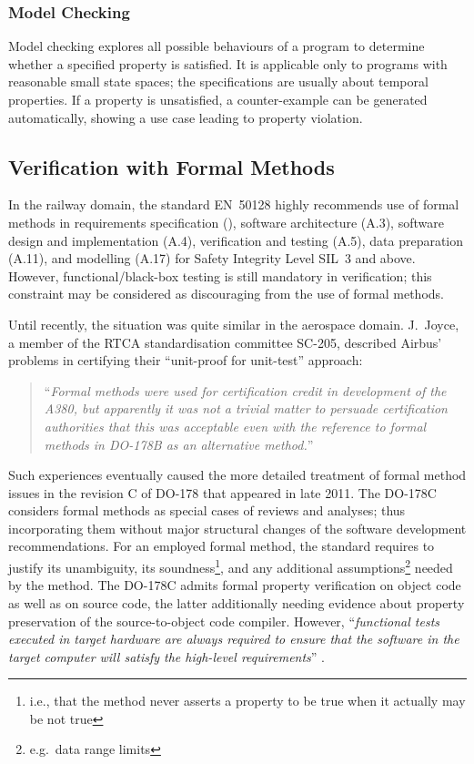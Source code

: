 \documentclass{template/openetcs_report}
\begin{document}
\subsubsection{Model Checking}
\label{sec:Model Checking}

Model checking
\cite{Clarke.Schlingloff.2001}\nocite{Robinson.Voronkov.2001}
explores all possible behaviours of a program to
determine whether a specified property is satisfied.
%
It is applicable only to programs with reasonable small state spaces;
the specifications are usually about temporal properties.
%
If a property is unsatisfied, a counter-example can be generated
automatically,
showing a use case leading to property violation.


\subsection{Verification with Formal Methods}

In the railway domain, the standard
EN~50128 highly recommends use of formal methods in
requirements specification (\cite[Table A.2]{en50128}),
software architecture (A.3),
software design and implementation (A.4),
verification and testing (A.5),
data preparation (A.11), and
modelling (A.17)
for Safety Integrity Level SIL~3 and above.
%
However, functional\slash black-box testing is still mandatory in
verification; this constraint may be considered as discouraging from
the use of formal methods.

Until recently, the situation was quite similar in the aerospace
domain.
%
J.\ Joyce, a member of the RTCA
standardisation committee SC-205, described
Airbus' problems in certifying their ``unit-proof for unit-test''
approach:

        \begin{quote}
        ``{\em Formal methods were used for certification credit in
        development of the A380, but apparently it was not a trivial
        matter to persuade certification authorities that this was
        acceptable even with the reference to formal methods in
        DO-178B as an alternative method.}''
        \end{quote}


Such experiences eventually caused the more detailed treatment of
formal method issues in the revision C of DO-178 that appeared in
late 2011.
%
The DO-178C considers formal methods as special cases of
reviews and analyses; thus incorporating them without major
structural changes of the software development recommendations.
%
For an employed formal method, the standard requires to justify its
unambiguity, its soundness\footnote{
        i.e., that the method never asserts a property to be true
        when it actually may be not true
},
and any additional assumptions\footnote{
        e.g.\ data range limits
}
needed by the method.
%
The DO-178C admits formal property verification on object code
as well as on source code, the latter additionally needing
evidence about property preservation of the source-to-object
code compiler.
%
However, ``{\em functional tests
executed in target hardware are always required to ensure that the
software in the target computer will satisfy the high-level requirements}''
\cite[FM.12.3.5]{DO-333}.
\end{document}
